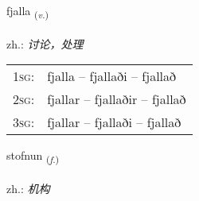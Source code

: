 \documentclass[frontgrid, backgrid]{flacards}\usepackage[]{graphicx}\usepackage[]{xcolor}
\begin{document}
\renewcommand{\blhead}{\vskip5pt {\small\bfseries\footnotesize Sagnorð | 动词 }}
\renewcommand{\bcfoot}{\vskip5pt \hspace{2pt}{\small\bfseries\footnotesize 1K}}


{fjalla \small{\textsubscript{(\textit{v.})}} \\[1ex] %
\textphonetic{[fjatla]} \\
zh.: \emph{讨论，处理} \\  [2ex]
\renewcommand*{\arraystretch}{0.8}
\begin{tabular}{p{1cm}l}
\textsc{1sg}: & fjalla -- fjallaði -- fjallað \\ 
\textsc{2sg}: & fjallar -- fjallaðir -- fjallað \\ 
\textsc{3sg}: & fjallar -- fjallaði -- fjallað \\ 
\end{tabular}
}

\renewcommand{\flhead}{\vskip5pt \fboxsep=0pt {\small\bfseries\footnotesize Nafnorð | 名词}}
\renewcommand{\fcfoot}{\vskip5pt \fboxsep=0pt \hspace{2pt}{\small\bfseries\footnotesize 1K}}

\renewcommand{\blhead}{\vskip5pt {\small\bfseries\footnotesize Nafnorð | 名词 }}
\renewcommand{\bcfoot}{\vskip5pt \hspace{2pt}{\small\bfseries\footnotesize 1K}}


{stofnun \small{\textsubscript{(\textit{f.})}} \\[1ex] %
\textphonetic{[stɔpnʏn]} \\
zh.: \emph{机构} \\  [2ex]
\renewcommand*{\arraystretch}{0.8}
}
\end{document}
